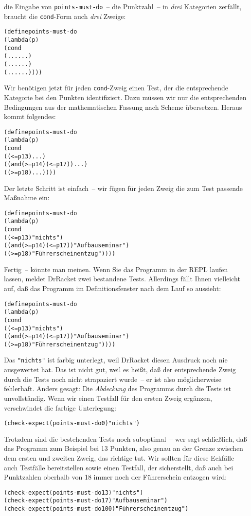 die Eingabe von \texttt{points-must-do}~-- die Punktzahl~-- in
\emph{drei} Kategorien zerfällt, braucht die \texttt{cond}-Form auch
\emph{drei} Zweige:
%
\begin{alltt}
(define points-must-do
  (lambda (p)
    (cond
      (... ...)
      (... ...)
      (... ...))))
\end{alltt}
%
Wir benötigen jetzt für jeden \texttt{cond}-Zweig einen Test, der die
entsprechende Kategorie bei den Punkten identifiziert.  Dazu müssen
wir nur die entsprechenden Bedingungen aus der mathematischen Fassung
nach Scheme übersetzen.  Heraus kommt folgendes:
%
\begin{alltt}
(define points-must-do
  (lambda (p)
    (cond
      ((<= p 13) ...)
      ((and (>= p 14) (<= p 17)) ...)
      ((>= p 18) ...))))
\end{alltt}
%
Der letzte Schritt ist einfach~-- wir fügen für jeden Zweig die zum
Test passende Maßnahme ein:
%
\begin{alltt}
(define points-must-do
  (lambda (p)
    (cond
      ((<= p 13) "nichts")
      ((and (>= p 14) (<= p 17)) "Aufbauseminar")
      ((>= p 18) "Führerscheinentzug"))))
\end{alltt}
%
Fertig~-- könnte man meinen.  Wenn Sie das Programm in der REPL laufen lassen,
meldet DrRacket zwei bestandene Tests.  Allerdings fällt Ihnen
vielleicht auf, daß das Programm im Definitionsfenster nach dem Lauf
so aussieht:
%
\begin{alltt}
(define points-must-do
  (lambda (p)
    (cond
      ((<= p 13) \colorbox{featuregray}{"nichts"})
      ((and (>= p 14) (<= p 17)) "Aufbauseminar")
      ((>= p 18) "Führerscheinentzug"))))
\end{alltt}
%
Das \verb|"nichts"| ist farbig unterlegt, weil DrRacket diesen
Ausdruck noch nie ausgewertet hat.  Das ist nicht gut, weil es heißt,
daß der entsprechende Zweig durch die Tests noch nicht strapaziert
wurde~-- er ist also möglicherweise fehlerhaft.  Anders gesagt: Die
\textit{Abdeckung} des Programms durch die Tests ist
unvollständig.  Wenn wir einen Testfall für den ersten Zweig ergänzen,
verschwindet die farbige Unterlegung:
%
\begin{alltt}
(check-expect (points-must-do 0) "nichts")
\end{alltt}
%
Trotzdem sind die bestehenden Tests noch suboptimal~-- wer sagt
schließlich, daß das Programm zum Beispiel bei 13 Punkten, also genau
an der Grenze zwischen dem ersten und zweiten Zweig, das richtige tut.
Wir sollten für diese Eckfälle auch Testfälle
bereitstellen sowie einen Testfall, der sicherstellt, daß auch bei
Punktzahlen oberhalb von 18 immer noch der Führerschein entzogen wird:
%
\begin{alltt}
(check-expect (points-must-do 13) "nichts")
(check-expect (points-must-do 17) "Aufbauseminar")
(check-expect (points-must-do 100) "Führerscheinentzug")
\end{alltt}


